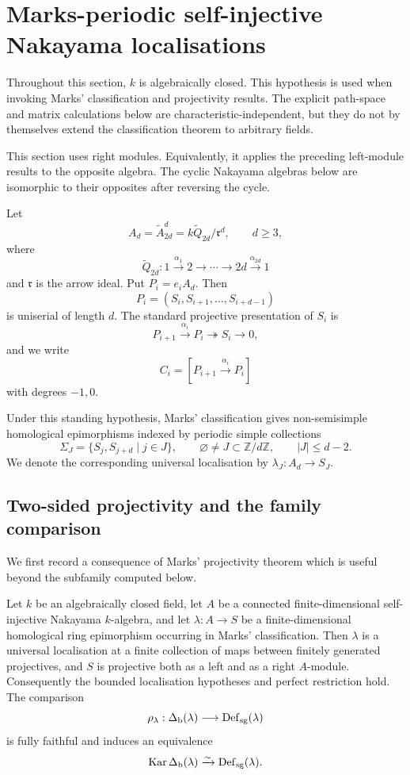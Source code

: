 
\section{Marks-periodic self-injective Nakayama localisations}\label{sec:nakayama}

Throughout this section, \(k\) is algebraically closed.  This hypothesis is used when invoking Marks' classification and projectivity results.  The explicit path-space and matrix calculations below are characteristic-independent, but they do not by themselves extend the classification theorem to arbitrary fields.

This section uses right modules.  Equivalently, it applies the preceding left-module results to the opposite algebra.  The cyclic Nakayama algebras below are isomorphic to their opposites after reversing the cycle.

Let
\[
 A_d=\widetilde A^d_{2d}
 =k\widetilde Q_{2d}/\mathfrak r^d,
 \qquad d\ge3,
\]
where
\[
 \widetilde Q_{2d}:1\xrightarrow{\alpha_1}2\longrightarrow\cdots
 \longrightarrow2d\xrightarrow{\alpha_{2d}}1
\]
and \(\mathfrak r\) is the arrow ideal.  Put \(P_i=e_iA_d\).  Then
\[
 P_i=(S_i,S_{i+1},\ldots,S_{i+d-1})
\]
is uniserial of length \(d\).  The standard projective presentation of \(S_i\) is
\[
 P_{i+1}\xrightarrow{\alpha_i}P_i\twoheadrightarrow S_i\to0,
\]
and we write
\[
 C_i=[P_{i+1}\xrightarrow{\alpha_i}P_i]
\]
with degrees \(-1,0\).

Under this standing hypothesis, Marks' classification gives non-semisimple homological epimorphisms indexed by periodic simple collections
\begin{equation}\label{eq:marks-collection}
 \Sigma_J=\{S_j,S_{j+d}\mid j\in J\},
 \qquad
 \varnothing\ne J\subset\mathbb Z/d\mathbb Z,
 \qquad
 |J|\le d-2.
\end{equation}
We denote the corresponding universal localisation by
\(\lambda_J:A_d\to S_J\).

\subsection{Two-sided projectivity and the family comparison}

We first record a consequence of Marks' projectivity theorem which is useful beyond the subfamily computed below.

\begin{theorem}\label{thm:all-nakayama-comparison}
Let \(k\) be an algebraically closed field, let \(A\) be a connected finite-dimensional self-injective Nakayama \(k\)-algebra, and let
\(\lambda:A\to S\) be a finite-dimensional homological ring epimorphism occurring in Marks' classification.  Then \(\lambda\) is a universal localisation at a finite collection of maps between finitely generated projectives, and \(S\) is projective both as a left and as a right \(A\)-module.  Consequently the bounded localisation hypotheses and perfect restriction hold.  The comparison
\[
 \rho_\lambda:\Delta_{\mathrm b}(\lambda)\longrightarrow\operatorname{Def}_{\mathrm{sg}}(\lambda)
\]
is fully faithful and induces an equivalence
\[
 \operatorname{Kar}\Delta_{\mathrm b}(\lambda)\xrightarrow{\sim}\operatorname{Def}_{\mathrm{sg}}(\lambda).
\]
\end{theorem}

